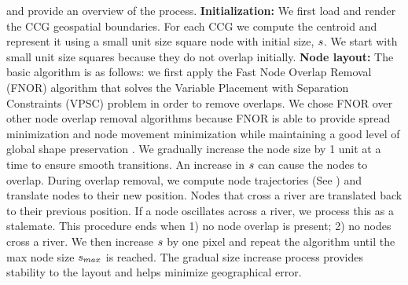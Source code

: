  and  provide an overview of the process. \textbf{Initialization:} We first load and render the CCG geospatial boundaries. For each CCG we compute the centroid and represent it using a small unit size square node with initial size, $ s $. We start with small unit size squares because they do not overlap initially. \textbf{Node layout:} The basic algorithm is as follows: we first apply the Fast Node Overlap Removal (FNOR) algorithm that solves the Variable Placement with Separation Constraints (VPSC) problem \cite{dwyer2006fast} in order to remove overlaps. We chose FNOR over other node overlap removal algorithms because FNOR is able to provide spread minimization and node movement minimization while maintaining a good level of global shape preservation \cite{chen2020Node}. We gradually increase the node size by 1 unit at a time to ensure smooth transitions. An increase in $ s $ can cause the nodes to overlap. During overlap removal, we compute node trajectories (See ) and translate nodes to their new position. Nodes that cross a river are translated back to their previous position. If a node oscillates across a river, we process this as a stalemate. This procedure ends when 1) no node overlap is present; 2) no nodes cross a river. We then increase $ s $ by one pixel and repeat the algorithm until the max node size $ s_{max} $ is reached. The gradual size increase process provides stability to the layout and helps minimize geographical error.


